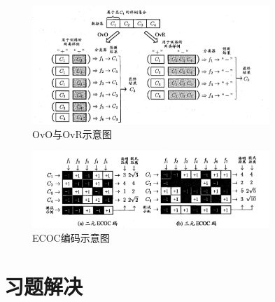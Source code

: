 \documentclass[12pt, a4paper]{article} %
\begin{document}
\begin{figure}[H]
    \centering
    \includegraphics[width=0.8\textwidth]{../img/3-4-OvO与OvR示意图.png}
    \caption{OvO与OvR示意图}
    \label{fig:OvO与OvR示意图}
\end{figure}

\begin{figure}[H]
    \centering
    \includegraphics[width=0.8\textwidth]{../img/3-5-ECOC编码示意图.png}
    \caption{ECOC编码示意图}
    \label{fig:ECOC编码示意图，“$+1, -1$”分别表示学习器 $f_i$ 将该类样本作为正、反例；三元码中“$0$”表示 $f_i$ 不使用该类样本}
\end{figure}

\section{习题解决}
\end{document}
